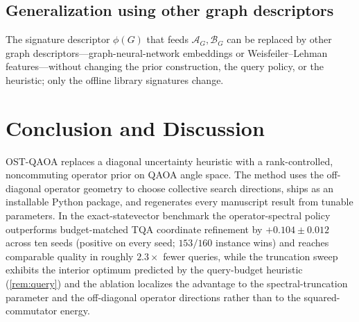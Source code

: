 \documentclass[aps,prxquantum,reprint,amsmath,amssymb,floatfix,nofootinbib,superscriptaddress,longbibliography]{revtex4-2}
\theoremstyle{remark}
\newcommand{\OSTQAOA}{\textnormal{\textsc{OST-QAOA}}}
\newcommand{\TQA}{\textnormal{\textsc{TQA}}}
\newcommand{\calA}{\mathcal{A}}
\newcommand{\calB}{\mathcal{B}}
\begin{document}
\subsection{Generalization using other graph descriptors}
\label{sec:otherdesc}
The signature descriptor \(\phi(G)\) that feeds \(\calA_G,\calB_G\) can be
replaced by other graph descriptors---graph-neural-network embeddings or
Weisfeiler--Lehman features---without changing the prior construction, the query
policy, or the heuristic; only the offline library signatures change.

\section{Conclusion and Discussion}
\label{sec:conclusion}

\OSTQAOA{} replaces a diagonal uncertainty heuristic with a rank-controlled,
noncommuting operator prior on QAOA angle space.  The method uses the off-diagonal
operator geometry to choose collective search directions, ships as an installable
Python package, and regenerates every manuscript result from tunable parameters.
In the exact-statevector benchmark the operator-spectral policy outperforms
budget-matched \TQA{} coordinate refinement by \(+0.104\pm0.012\) across ten seeds
(positive on every seed; \(153/160\) instance wins) and reaches comparable
quality in roughly \(2.3\times\) fewer queries, while the truncation sweep
exhibits the interior optimum predicted by the query-budget heuristic
(\cref{rem:query}) and the ablation localizes the advantage to the
spectral-truncation parameter and the off-diagonal operator directions rather than
to the squared-commutator energy.
\end{document}
